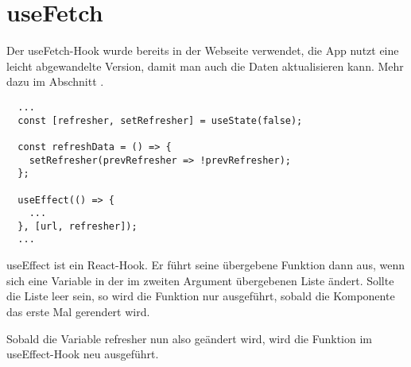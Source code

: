 \section{useFetch}
Der useFetch-Hook wurde bereits in der Webseite verwendet, die App nutzt eine leicht abgewandelte
Version, damit man auch die Daten aktualisieren kann. Mehr dazu im Abschnitt .

\begin{lstlisting}
  ...
  const [refresher, setRefresher] = useState(false);

  const refreshData = () => {
    setRefresher(prevRefresher => !prevRefresher);
  };

  useEffect(() => {
    ...
  }, [url, refresher]);
  ...
\end{lstlisting}

useEffect ist ein React-Hook. Er führt seine übergebene Funktion dann aus, wenn sich eine Variable
in der im zweiten Argument übergebenen Liste ändert. Sollte die Liste leer sein, so wird die
Funktion nur ausgeführt, sobald die Komponente das erste Mal gerendert wird.

Sobald die Variable refresher nun also geändert wird, wird die Funktion im useEffect-Hook neu
ausgeführt.